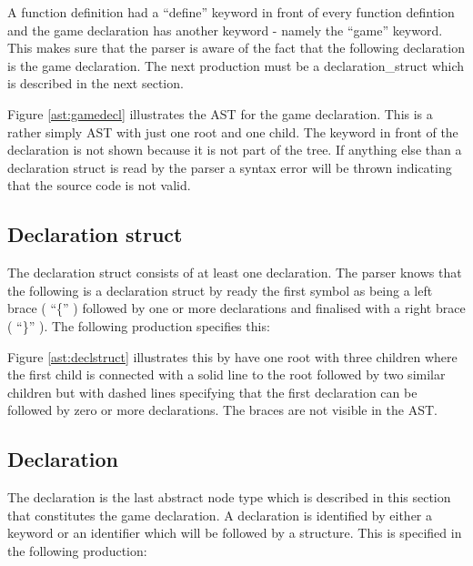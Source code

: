 \begin{ebnf}%
%
\end{ebnf}%

A function definition had a ``define'' keyword in front of every function defintion and the game declaration has another keyword - namely the ``game'' keyword. This makes sure that the parser is aware of the fact that the following declaration is the game declaration. The next production must be a declaration\_struct which is described in the next section.%

%

Figure \ref{ast:gamedecl} illustrates the AST for the game declaration. This is a rather simply AST with just one root and one child. The keyword in front of the declaration is not shown because it is not part of the tree. If anything else than a declaration struct is read by the parser a syntax error will be thrown indicating that the source code is not valid.%

\subsection{Declaration struct}%

The declaration struct consists of at least one declaration. The parser knows that the following is a declaration struct by ready the first symbol as being a left brace ( ``\{'' ) followed by one or more declarations and finalised with a right brace ( ``\}'' ). The following production specifies this:%

\begin{ebnf}%
%
\end{ebnf}%

%

Figure \ref{ast:declstruct} illustrates this by have one root with three children where the first child is connected with a solid line to the root followed by two similar children but with dashed lines specifying that the first declaration can be followed by zero or more declarations. The braces are not visible in the AST.%

\subsection{Declaration}%
The declaration is the last abstract node type which is described in this section that constitutes the game declaration. A declaration is identified by either a keyword or an identifier which will be followed by a structure. This is specified in the following production:%

